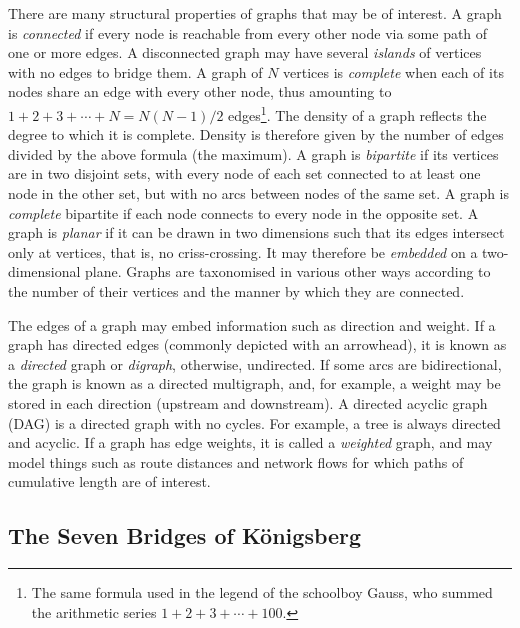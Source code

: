 \documentclass[11pt]{amsart}
\begin{document}
There are many structural properties of graphs that may be of interest. A graph is \emph{connected} if every node is reachable from every other node via some path of one or more edges. A disconnected graph may have several \emph{islands} of vertices with no edges to bridge them. A graph of $N$ vertices is \emph{complete} when each of its nodes share an edge with every other node, thus amounting to $1 + 2 + 3 + \cdots + N = N(N - 1)/2$ edges\footnote{The same formula used in the legend of the schoolboy Gauss, who summed the arithmetic series $1 + 2 + 3 + \cdots + 100$.}.  The density of a graph reflects the degree to which it is complete. Density is therefore given by the number of edges divided by the above formula (the maximum). A graph is \emph{bipartite} if its vertices are in two disjoint sets, with every node of each set connected to at least one node in the other set, but with no arcs between nodes of the same set. A graph is \emph{complete} bipartite if each node connects to every node in the opposite set. A graph is \emph{planar} if it can be drawn in two dimensions such that its edges intersect only at vertices, that is, no criss-crossing. It may therefore be \emph{embedded} on a two-dimensional plane. Graphs are taxonomised in various other ways according to the number of their vertices and the manner by which they are connected.

The edges of a graph may embed information such as direction and weight. If a graph has directed edges (commonly depicted with an arrowhead), it is known as a \emph{directed} graph or \emph{digraph}, otherwise, undirected. If some arcs are bidirectional, the graph is known as a directed multigraph, and, for example, a weight may be stored in each direction (upstream and downstream). A directed acyclic graph (DAG) is a directed graph with no cycles. For example, a tree is always directed and acyclic. If a graph has edge weights, it is called a \emph{weighted} graph, and may model things such as route distances and network flows for which paths of cumulative length are of interest.

\subsection{The Seven Bridges of K\"onigsberg}
\end{document}
